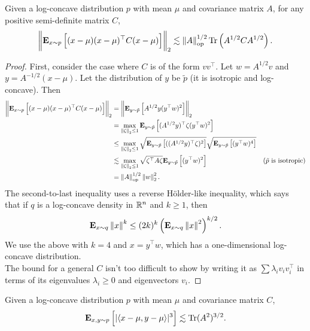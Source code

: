 		\begin{lemma}
			\label{lee-vem: growth lemma 1}
			Given a log-concave distribution $p$ with mean $\mu$ and covariance matrix $A$, for any positive semi-definite matrix $C$,
			\[ \left\lVert\textbf{E}_{x\sim p}\left[(x-\mu)(x-\mu)^\top C (x-\mu)\right]\right\rVert_2 \lesssim \left\lVert A\right\rVert_{\text{op}}^{1/2} \operatorname{Tr}\left(A^{1/2}CA^{1/2}\right). \]
		\end{lemma}
		\begin{proof}
			First, consider the case where $C$ is of the form $vv^\top$. Let $w = A^{1/2}v$ and $y = A^{-1/2}(x-\mu)$. Let the distribution of $y$ be $\tilde{p}$ (it is isotropic and log-concave). Then
			\begin{align*}
				\left\lVert\textbf{E}_{x \sim p}\left[(x-\mu)(x-\mu)^\top C (x-\mu)\right]\right\rVert_2 &= \left\lVert\textbf{E}_{y\sim \tilde{p}}\left[A^{1/2}y(y^\top w)^2\right]\right\rVert_2 \\
					&= \max_{\left\lVert\zeta\right\rVert_2 \leq 1} \textbf{E}_{y\sim\tilde{p}}\left[(A^{1/2}y)^\top \zeta (y^\top w)^2\right] \\
					&\leq \max_{\left\lVert\zeta\right\rVert_2 \leq 1} \sqrt{\textbf{E}_{y\sim\tilde{p}}\left[((A^{1/2}y)^\top \zeta)^2\right]} \sqrt{\textbf{E}_{y\sim\tilde{p}} \left[(y^\top w)^4\right]} \\
					&\lesssim \max_{\left\lVert\zeta\right\rVert_2 \leq 1} \sqrt{\zeta^\top A \zeta} \textbf{E}_{y \sim \tilde{p}} \left[(y^\top w)^2\right] & (\tilde{p}\text{ is isotropic}) \\
					&= \left\lVert A\right\rVert_{\text{op}}^{1/2} \left\lVert w\right\rVert_2^2.
			\end{align*}
			The second-to-last inequality uses a reverse H\"{o}lder-like inequality, which says that if $q$ is a log-concave density in $\mathbb{R}^n$ and $k\geq 1$, then
			\[ \textbf{E}_{x \sim q} \left\lVert x\right\rVert^k \leq (2k)^k \left(\textbf{E}_{x \sim q} \left\lVert x\right\rVert^2 \right)^{k/2}. \]
			We use the above with $k=4$ and $x = y^\top w$, which has a one-dimensional log-concave distribution.\\
			The bound for a general $C$ isn't too difficult to show by writing it as $\sum \lambda_i v_i v_i^\top$ in terms of its eigenvalues $\lambda_i \geq 0$ and eigenvectors $v_i$.
		\end{proof}

		\begin{lemma}
			\label{lee-vem: growth lemma 2}
			Given a log-concave distribution $p$ with mean $\mu$ and covariance matrix $C$,
			\[ \textbf{E}_{x,y \sim p} \left[ |\langle x-\mu,y-\mu\rangle|^3 \right] \lesssim \operatorname{Tr}(A^2)^{3/2}. \]
		\end{lemma}

